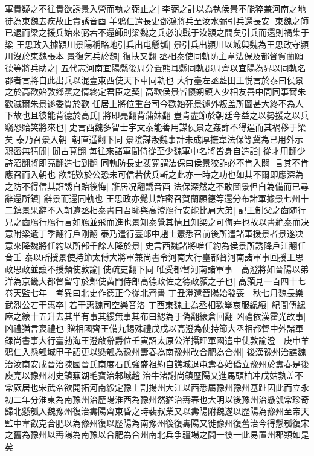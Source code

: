 軍貴疑之不往貴欲誘景入營而執之弼止之|{
	李弼之計以為執侯景不能猝兼河南之地徒為東魏去疾故止貴誘音酉}
羊鴉仁遣長史鄧鴻將兵至汝水弼引兵還長安|{
	東魏之師已退而梁之援兵始來弼若不還師則梁魏之兵必浪戰于汝潁之間矣引兵而還則禍集于梁}
王思政入據潁川景陽稱略地引兵出屯懸瓠|{
	景引兵出潁川以城與魏為王思政守潁川沒於東魏張本}
景復乞兵於魏|{
	復扶又翻}
丞相泰使同軌防主韋法保及都督賀蘭願德等將兵助之|{
	五代志河南宜陽縣後周分置熊耳縣同軌郡周齊以宜陽為界以同軌名郡者言將自此出兵以混壹東西使天下車同軌也}
大行臺左丞藍田王悦言於泰曰侯景之於高歡始敦鄉黨之情終定君臣之契|{
	高歡侯景皆懷朔鎮人少相友善中間同事爾朱歡滅爾朱景遂委質於歡}
任居上將位重台司今歡始死景遽外叛盖所圖甚大終不為人下故也且彼能背德於高氏|{
	將即亮翻背蒲妹翻}
豈肯盡節於朝廷今益之以勢援之以兵竊恐貽笑將來也|{
	史言西魏多智士宇文泰能善用謀侯景之姦詐不得逞而其禍移于梁矣}
泰乃召景入朝|{
	朝直遥翻下同}
景隂謀叛魏事計未成厚撫韋法保等冀為已用外示親密無猜閒|{
	閒古莧翻}
每往來諸軍間侍從至少魏軍中名將皆身自造詣|{
	從才用翻少詩沼翻將即亮翻造七到翻}
同軌防長史裴寛謂法保曰侯景狡詐必不肯入關|{
	言其不肯應召而入朝也}
欲託欵於公恐未可信若伏兵斬之此亦一時之功也如其不爾即應深為之防不得信其誑誘自貽後悔|{
	誑居况翻誘音酉}
法保深然之不敢圖景但自為備而已尋辭還所鎮|{
	辭景而還同軌也}
王思政亦覺其詐密召賀蘭願德等還分布諸軍據景七州十二鎮景果辭不入朝遺丞相泰書曰吾恥與高澄鴈行安能比肩大弟|{
	記王制父之齒随行兄之齒鴈行鴈行言如鴈並飛而進也景知泰覺其情且知梁之可侮弄也故以書絶泰而决意附梁遺丁季翻行戶剛翻}
泰乃遣行臺郎中趙士憲悉召前後所遣諸軍援景者景遂决意來降魏將任約以所部千餘人降於景|{
	史言西魏諸將唯任約為侯景所誘降戶江翻任音壬}
泰以所授景使持節太傅大將軍兼尚書令河南大行臺都督河南諸軍事回授王思政思政並讓不授頻使敦諭|{
	使疏吏翻下同}
唯受都督河南諸軍事　高澄將如晉陽以弟洋為京畿大都督留守於鄴使黄門侍郎高德政佐之德政顥之子也|{
	高顥見一百四十七卷天監七年　考異曰北史作德正今從北齊書}
丁丑澄還晉陽始發喪　秋七月魏長樂武烈公若干惠卒|{
	若干惠魏司空樂音洛}
丁酉東魏主為丞相歡舉哀服緦縗|{
	紀間傳緦麻之縗十五升去其半有事其縷無事其布曰緦為于偽翻縗倉回翻}
凶禮依漢霍光故事|{
	凶禮猶言喪禮也}
贈相國齊王備九錫殊禮戊戌以高澄為使持節大丞相都督中外諸軍録尚書事大行臺勃海王澄啟辭爵位壬寅詔太原公洋攝理軍國遣中使敦諭澄　庚申羊鴉仁入懸瓠城甲子詔更以懸瓠為豫州夀春為南豫州改合肥為合州|{
	後漢豫州治譙魏治汝南安成晉治陳國晉氏南度石氏強盛祖約自譙城退屯夀春始僑立豫州於夀春是後庾亮以豫州刺史鎮蕪湖毛寶治邾城趙治牛渚謝尚鎮歷陽又進馬頭柏冲戌姑孰盖不常厥居也宋武帝欲開拓河南綏定豫土割揚州大江以西悉屬豫州豫州基趾因此而立永初二年分淮東為南豫州治歷陽淮西為豫州然猶治夀春也大明以後豫州治懸瓠常珍奇歸北懸瓠入魏豫州復治夀陽齊東昏之時裴叔業又以夀陽附魏遂以歷陽為豫州至帝天監中韋叡克合肥以為豫州復以歷陽為南豫州後復夀陽又徙豫州復舊治今得懸瓠復宋之舊為豫州以夀陽為南豫以合肥為合州南北兵争疆場之間一彼一此易置州郡類如是矣}
